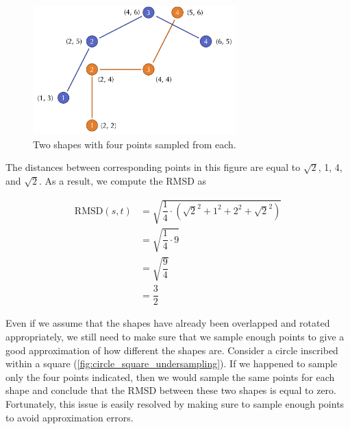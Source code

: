 \begin{figure}[h]
	\centering
	\mySfFamily
	\includegraphics[width = 0.7\textwidth]{../images/rmsd_simple_shapes.png}
	\caption{Two shapes with four points sampled from each.}
	\label{fig:rmsd_simple_shapes}
\end{figure}

The distances between corresponding points in this figure are equal to $\sqrt{2}$, 1, 4, and $\sqrt{2}$. As a result, we compute the RMSD as

\begin{align*}
	\text{RMSD}(s, t) &= \sqrt{\dfrac{1}{4} \cdot (\sqrt{2}^2 + 1^2 + 2^2 + \sqrt{2}^2)} \\
	&= \sqrt{\dfrac{1}{4} \cdot 9}\\
	&= \sqrt{\dfrac{9}{4}}\\
	&= \dfrac{3}{2}
\end{align*}


\begin{qbox}\end{qbox}

Even if we assume that the shapes have already been overlapped and rotated appropriately, we still need to make sure that we sample enough points to give a good approximation of how different the shapes are. Consider a circle inscribed within a square (\autoref{fig:circle_square_undersampling}). If we happened to sample only the four points indicated, then we would sample the same points for each shape and conclude that the RMSD between these two shapes is equal to zero. Fortunately, this issue is easily resolved by making sure to sample enough points to avoid approximation errors.\\

